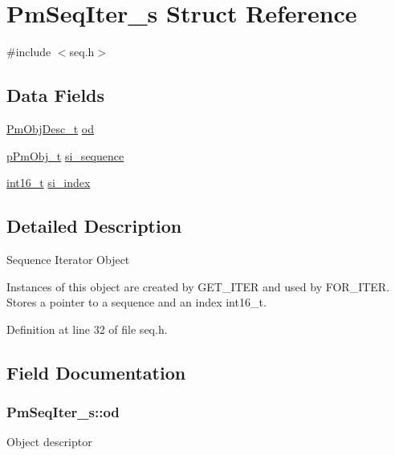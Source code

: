 \hypertarget{struct_pm_seq_iter__s}{\section{Pm\-Seq\-Iter\-\_\-s Struct Reference}
\label{struct_pm_seq_iter__s}
}


{\ttfamily \#include $<$seq.\-h$>$}

\subsection*{Data Fields}
\begin{DoxyCompactItemize}
\item 
\hyperlink{obj_8h_a72d816790acd8eb550fb25268c2b3489}{Pm\-Obj\-Desc\-\_\-t} \hyperlink{struct_pm_seq_iter__s_a3bdc36566b84097a71164dd66fd7de48}{od}
\item 
\hyperlink{obj_8h_af293479fa3f9d92b941ee7445ad3960e}{p\-Pm\-Obj\-\_\-t} \hyperlink{struct_pm_seq_iter__s_ae8a29eb27845a6f888c6057f84e68cf5}{si\-\_\-sequence}
\item 
\hyperlink{stdint_8h_aa343fa3b3d06292b959ffdd4c4703b06}{int16\-\_\-t} \hyperlink{struct_pm_seq_iter__s_a57ff61771c7f464a8cada8f517502c37}{si\-\_\-index}
\end{DoxyCompactItemize}


\subsection{Detailed Description}
Sequence Iterator Object

Instances of this object are created by G\-E\-T\-\_\-\-I\-T\-E\-R and used by F\-O\-R\-\_\-\-I\-T\-E\-R. Stores a pointer to a sequence and an index int16\-\_\-t. 

Definition at line 32 of file seq.\-h.



\subsection{Field Documentation}
\hypertarget{struct_pm_seq_iter__s_a3bdc36566b84097a71164dd66fd7de48}{
\subsubsection[{od}]{ Pm\-Seq\-Iter\-\_\-s\-::od}}\label{struct_pm_seq_iter__s_a3bdc36566b84097a71164dd66fd7de48}
Object descriptor 

